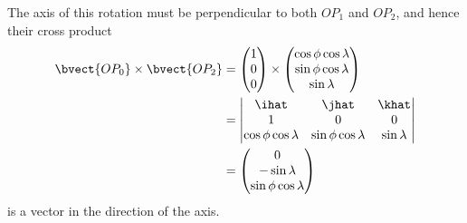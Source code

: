 \begin{enumerate}
          The axis of this rotation must be perpendicular to both \(O P_1\) and \(O P_2\), and hence their cross product
          \begin{align*}
              \bvect{O P_0} \times \bvect{O P_2} & = \begin{pmatrix}
                                                         1 \\
                                                         0 \\
                                                         0
                                                     \end{pmatrix} \times \begin{pmatrix}
                                                                              \cos \phi \cos \lambda \\
                                                                              \sin \phi \cos \lambda \\
                                                                              \sin \lambda
                                                                          \end{pmatrix}                    \\
                                                 & = \begin{vmatrix}
                                                         \ihat                  & \jhat                  & \khat        \\
                                                         1                      & 0                      & 0            \\
                                                         \cos \phi \cos \lambda & \sin \phi \cos \lambda & \sin \lambda
                                                     \end{vmatrix} \\
                                                 & = \begin{pmatrix}
                                                         0              \\
                                                         - \sin \lambda \\
                                                         \sin \phi \cos \lambda
                                                     \end{pmatrix}
          \end{align*}
          is a vector in the direction of the axis.
\end{enumerate}